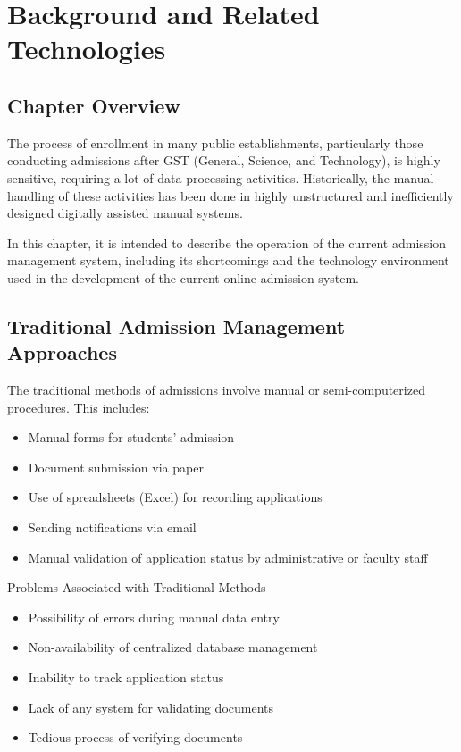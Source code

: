 \chapter{Background and Related Technologies}

\section{Chapter Overview}

The process of enrollment in many public establishments, particularly those conducting admissions after GST (General, Science, and Technology), is highly sensitive, requiring a lot of data processing activities. Historically, the manual handling of these activities has been done in highly unstructured and inefficiently designed digitally assisted manual systems.

In this chapter, it is intended to describe the operation of the current admission management system, including its shortcomings and the technology environment used in the development of the current online admission system.

\section{Traditional Admission Management Approaches}

The traditional methods of admissions involve manual or semi-computerized procedures. This includes:

\begin{itemize}
    \item Manual forms for students’ admission
    \item Document submission via paper
    \item Use of spreadsheets (Excel) for recording applications
    \item Sending notifications via email
    \item Manual validation of application status by administrative or faculty staff
\end{itemize}

{Problems Associated with Traditional Methods}

\begin{itemize}
    \item Possibility of errors during manual data entry
    \item Non-availability of centralized database management
    \item Inability to track application status
    \item Lack of any system for validating documents
    \item Tedious process of verifying documents
\end{itemize}

